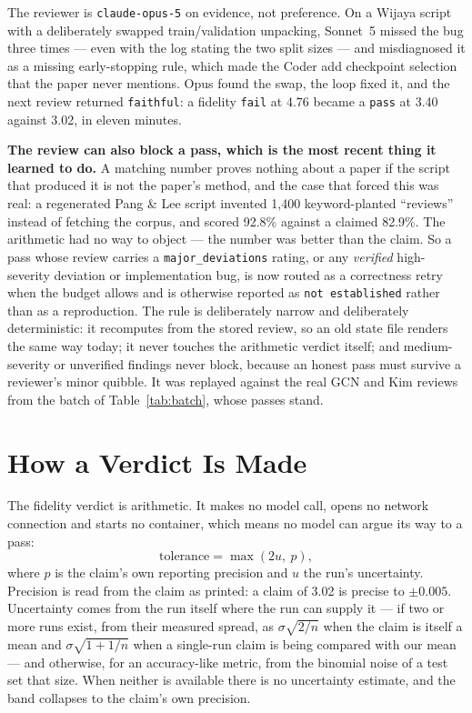 \documentclass[11pt]{article}
\begin{document}
The reviewer is \texttt{claude-opus-5} on evidence, not preference. On a Wijaya script with a
deliberately swapped train/validation unpacking, Sonnet~5 missed the bug three times --- even with
the log stating the two split sizes --- and misdiagnosed it as a missing early-stopping rule,
which made the Coder add checkpoint selection that the paper never mentions. Opus found the swap,
the loop fixed it, and the next review returned \texttt{faithful}: a fidelity \texttt{fail} at
4.76 became a \texttt{pass} at 3.40 against 3.02, in eleven minutes.

\textbf{The review can also block a pass, which is the most recent thing it learned to do.} A
matching number proves nothing about a paper if the script that produced it is not the paper's
method, and the case that forced this was real: a regenerated Pang \& Lee script invented 1,400
keyword-planted ``reviews'' instead of fetching the corpus, and scored 92.8\% against a claimed
82.9\%. The arithmetic had no way to object --- the number was better than the claim. So a pass
whose review carries a \texttt{major\_deviations} rating, or any \emph{verified} high-severity
deviation or implementation bug, is now routed as a correctness retry when the budget allows and
is otherwise reported as \texttt{not established} rather than as a reproduction. The rule is
deliberately narrow and deliberately deterministic: it recomputes from the stored review, so an
old state file renders the same way today; it never touches the arithmetic verdict itself; and
medium-severity or unverified findings never block, because an honest pass must survive a
reviewer's minor quibble. It was replayed against the real GCN and Kim reviews from the batch of
Table~\ref{tab:batch}, whose passes stand.

\section{How a Verdict Is Made}
\label{sec:verdict}

The fidelity verdict is arithmetic. It makes no model call, opens no network connection and starts
no container, which means no model can argue its way to a pass:
\[
  \text{tolerance} = \max(2u,\ p),
\]
where $p$ is the claim's own reporting precision and $u$ the run's uncertainty. Precision is read
from the claim as printed: a claim of 3.02 is precise to $\pm 0.005$. Uncertainty comes from the
run itself where the run can supply it --- if two or more runs exist,
from their measured spread, as $\sigma\sqrt{2/n}$ when the claim is itself a mean and
$\sigma\sqrt{1 + 1/n}$ when a single-run claim is being compared with our mean --- and otherwise,
for an accuracy-like metric, from the binomial noise of a test set that size. When neither is
available there is no uncertainty estimate, and the band collapses to the claim's own precision.
\end{document}
